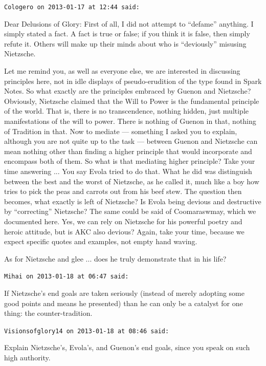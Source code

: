 \begin{footnotesize}
\begin{sffamily}
\hfill

\texttt{Cologero on 2013-01-17 at 12:44 said:}

Dear Delusions of Glory: First of all, I did not attempt to ``defame'' anything. I simply stated a fact. A fact is true or false; if you think it is false, then simply refute it. Others will make up their minds about who is ``deviously'' misusing Nietzsche.

Let me remind you, as well as everyone else, we are interested in discussing principles here, not in idle displays of pseudo-erudition of the type found in Spark Notes. So what exactly are the principles embraced by Guenon and Nietzsche? Obviously, Nietzsche claimed that the Will to Power is the fundamental principle of the world. That is, there is no transcendence, nothing hidden, just multiple manifestations of the will to power. There is nothing of Guenon in that, nothing of Tradition in that. Now to mediate --- something I asked you to explain, although you are not quite up to the task --- between Guenon and Nietzsche can mean nothing other than finding a higher principle that would incorporate and encompass both of them. So what is that mediating higher principle? Take your time answering ... You say Evola tried to do that. What he did was distinguish between the best and the worst of Nietzsche, as he called it, much like a boy how tries to pick the peas and carrots out from his beef stew. The question then becomes, what exactly is left of Nietzsche? Is Evola being devious and destructive by ``correcting'' Nietzsche? The same could be said of Coomaraswmay, which we documented here. Yes, we can rely on Nietzsche for his powerful poetry and heroic attitude, but is AKC also devious? Again, take your time, because we expect specific quotes and examples, not empty hand waving.

As for Nietzsche and glee ... does he truly demonstrate that in his life?

\hfill

\texttt{Mihai on 2013-01-18 at 06:47 said:}

If Nietzsche's end goals are taken seriously (instead of merely adopting some good points and means he presented) than he can only be a catalyst for one thing: the counter-tradition.

\hfill

\texttt{Visionsofglory14 on 2013-01-18 at 08:46 said:}

Explain Nietzsche's, Evola's, and Guenon's end goals, since you speak on such high authority.


\end{sffamily}
\end{footnotesize}
